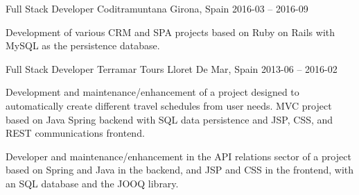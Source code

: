\documentclass[]{awesome-cv}
\begin{document}
\begin{cventries}
	\cventry
	{Full Stack Developer}
	{Coditramuntana}
	{Girona, Spain}
	{2016-03 – 2016-09}
	{\begin{cvitems}
		\vspace{0.5mm}
		\item {Development of various CRM and SPA projects based on Ruby on Rails with MySQL as the persistence database.}
		\end{cvitems}}


	\cventry
	{Full Stack Developer}
	{Terramar Tours}
	{Lloret De Mar, Spain}
	{2013-06 – 2016-02}
	{\begin{cvitems}
		\vspace{0.5mm}
		\item {Development and maintenance/enhancement of a project designed to automatically create different travel schedules from user needs. MVC project based on Java Spring backend with SQL data persistence and JSP, CSS, and REST communications frontend.}
  \item {Developer and maintenance/enhancement in the API relations sector of a project based on Spring and Java in the backend, and JSP and CSS in the frontend, with an SQL database and the JOOQ library.}
		\end{cvitems}}
\end{cventries}
\end{document}
